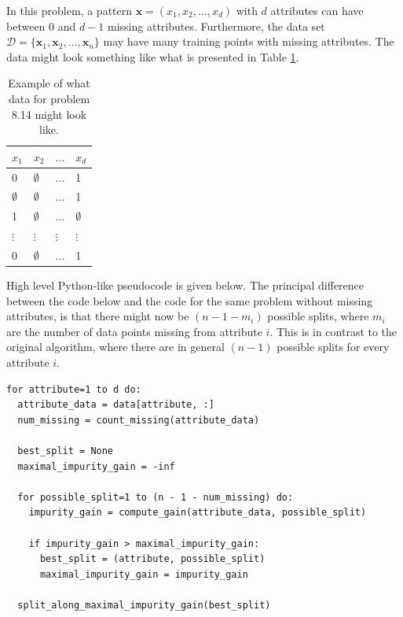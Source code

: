 \documentclass[12pt, a4paper]{article}
\newcommand{\D}{\mathcal{D}}
\newcommand{\vect}[1]{\bm{#1}}
\begin{document}
{In this problem, a pattern $\vect{x} = (x_1, x_2, \dots ,x_d)$ with $d$ attributes can have between $0$ and $d-1$ missing attributes.
Furthermore, the data set $\D = \{\vect{x}_1, \vect{x}_2, \dots, \vect{x}_n \}$ may have many training points with missing attributes.
The data might look something like what is presented in Table \ref{table:problem8_14}.

\begin{table}[ht!]
	\centering
	\caption{Example of what data for problem 8.14 might look like.}
	\begin{tabular}{@{}llll@{}} \toprule
		$x_1$	& $x_2$ & $\dots$ & $x_d$  \\ \midrule
		0 & $\emptyset$ & $\dots$ & 1 \\
		$\emptyset$ & $\emptyset$ & $\dots$ &  1 \\
		1 & $\emptyset$ & $\dots$ & $\emptyset$ \\
		$\vdots$ & $\vdots$ & $\vdots$ & $\vdots$ \\
		0 & $\emptyset$ & $\dots$ & 1 \\ \bottomrule
	\end{tabular}
	\label{table:problem8_14}
\end{table}

High level Python-like pseudocode is given below. 
The principal difference between the code below and the code for the same problem without missing attributes, is that there might now be $(n - 1 - m_i)$ possible splits, where $m_i$ are the number of data points missing from attribute $i$.
This is in contrast to the original algorithm, where there are in general $(n-1)$ possible splits for every attribute $i$.
\begin{Verbatim}
for attribute=1 to d do:
  attribute_data = data[attribute, :]
  num_missing = count_missing(attribute_data)
  
  best_split = None
  maximal_impurity_gain = -inf
  
  for possible_split=1 to (n - 1 - num_missing) do:
    impurity_gain = compute_gain(attribute_data, possible_split)
    
    if impurity_gain > maximal_impurity_gain:
	  best_split = (attribute, possible_split)
	  maximal_impurity_gain = impurity_gain
	  
  split_along_maximal_impurity_gain(best_split)
\end{Verbatim}


}
\end{document}
